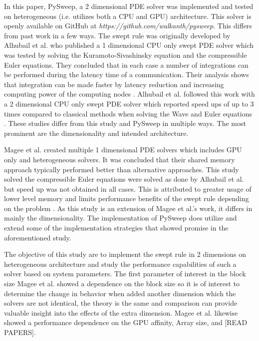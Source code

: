 \documentclass[review]{elsarticle}
\begin{document}
\par
In this paper, PySweep, a 2 dimensional PDE solver was implemented and tested on heterogeneous (i.e. utilizes both a CPU and GPU) architecture. This solver is openly available on GitHub at \textit{https://github.com/walkanth/pysweep}. This differs from past work in a few ways. The swept rule was originally developed by Alhubail et al. who published a 1 dimensional CPU only swept PDE solver which was tested by solving the Kuramoto-Sivashinsky equation and the compressible Euler equations. They concluded that in each case a number of integrations can be performed during the latency time of a communication. Their analysis shows that integration can be made faster by latency reduction and increasing computing power of the computing nodes \cite{Alhubail2016ThePDEs}. Alhubail et al. followed this work with a 2 dimensional CPU only swept PDE solver which reported speed ups of up to 3 times compared to classical methods when solving the Wave and Euler equations \cite{Alhubail2018ThePDEs}. These studies differ from this study and PySweep in multiple ways. The most prominent are the dimensionality and intended architecture.
\par
Magee et al. created multiple 1 dimensional PDE solvers which includes GPU only and heterogeneous solvers. It was concluded that their shared memory approach typically performed better than alternative approaches. This study solved the compressible Euler equations were solved as done by Alhubail et al. \cite{Alhubail2016ThePDEs} but speed up was not obtained in all cases. This is attributed to greater usage of lower level memory and limits performance benefits of the swept rule depending on the problem \cite{Magee2018AcceleratingDecomposition}. As this study is an extension of Magee et al.'s work, it differs in mainly the dimensionality. The implementation of PySweep does utilize and extend some of the implementation strategies that showed promise in the aforementioned study.

\par
The objective of this study are to implement the swept rule in 2 dimensions on heterogeneous architecture and study the performance capabilities of such a solver based on system parameters. The first parameter of interest in the block size Magee et al. showed a dependence on the block size so it is of interest to determine the change in behavior when added another dimension which the solvers are not identical, the theory is the same and comparison can provide valuable insight into the effects of the extra dimension. Magee et al. likewise showed a performance dependence on the GPU affinity, Array size, and [READ PAPERS].
\end{document}
